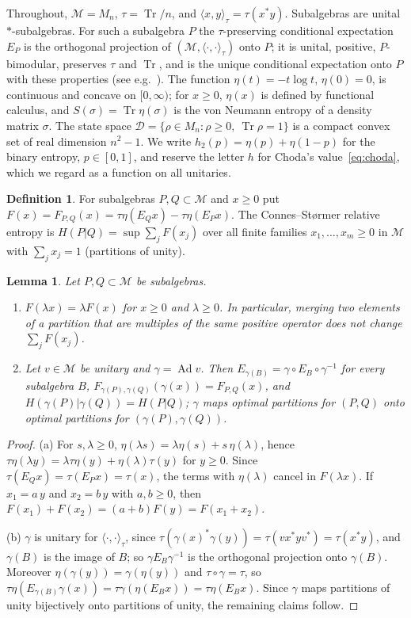 \documentclass[11pt]{article}
\DeclareMathOperator{\Tr}{Tr}
\DeclareMathOperator{\Ad}{Ad}
\newcommand{\M}{\mathcal{M}}
\newcommand{\D}{\mathcal{D}}
\theoremstyle{plain}
\newtheorem{lemma}[theorem]{Lemma}
\theoremstyle{definition}
\newtheorem{definition}[theorem]{Definition}
\theoremstyle{remark}
\begin{document}
Throughout, $\M=M_n$, $\tau=\Tr/n$, and $\langle x,y\rangle_\tau=\tau(x^*y)$. Subalgebras are unital $*$-subalgebras. For such
a subalgebra $P$ the $\tau$-preserving conditional expectation $E_P$ is the orthogonal projection of $(\M,\langle\cdot,\cdot
\rangle_\tau)$ onto $P$; it is unital, positive, $P$-bimodular, preserves $\tau$ and $\Tr$, and is the unique conditional
expectation onto $P$ with these properties (see e.g.~\cite{takesaki2002}). The function $\eta(t)=-t\log t$, $\eta(0)=0$, is
continuous and concave on $[0,\infty)$; for $x\ge0$, $\eta(x)$ is defined by functional calculus, and
$S(\sigma)=\Tr\eta(\sigma)$ is the von Neumann entropy of a density matrix $\sigma$. The state space
$\D=\{\rho\in M_n:\rho\ge0,\ \Tr\rho=1\}$ is a compact convex set of real dimension $n^2-1$. We write
$h_2(p)=\eta(p)+\eta(1-p)$ for the binary entropy, $p\in[0,1]$, and reserve the letter $h$ for Choda's
value~\eqref{eq:choda}, which we regard as a function on all unitaries.

\begin{definition}\label{def:cs}
For subalgebras $P,Q\subset\M$ and $x\ge0$ put $F(x)=F_{P,Q}(x)=\tau\eta(E_Qx)-\tau\eta(E_Px)$. The Connes--St{\o}rmer relative
entropy is $H(P|Q)=\sup\sum_jF(x_j)$ over all finite families $x_1,\dots,x_m\ge0$ in $\M$ with $\sum_jx_j=1$ (partitions
of unity).
\end{definition}

\begin{lemma}\label{lem:F}
Let $P,Q\subset\M$ be subalgebras.
\begin{enumerate}
\item[(a)] $F(\lambda x)=\lambda F(x)$ for $x\ge0$ and $\lambda\ge0$. In particular, merging two elements of a partition
that are multiples of the same positive operator does not change $\sum_jF(x_j)$.
\item[(b)] Let $v\in\M$ be unitary and $\gamma=\Ad v$. Then $E_{\gamma(B)}=\gamma\circ E_B\circ\gamma^{-1}$ for every subalgebra
$B$, $F_{\gamma(P),\gamma(Q)}(\gamma(x))=F_{P,Q}(x)$, and $H(\gamma(P)|\gamma(Q))=H(P|Q)$; $\gamma$ maps optimal partitions for
$(P,Q)$ onto optimal partitions for $(\gamma(P),\gamma(Q))$.
\end{enumerate}
\end{lemma}
\begin{proof}
(a) For $s,\lambda\ge0$, $\eta(\lambda s)=\lambda\eta(s)+s\,\eta(\lambda)$, hence $\tau\eta(\lambda y)=\lambda\tau\eta(y)+\eta(\lambda)\tau(y)$
for $y\ge0$. Since $\tau(E_Qx)=\tau(E_Px)=\tau(x)$, the terms with $\eta(\lambda)$ cancel in $F(\lambda x)$. If
$x_1=a\,y$ and $x_2=b\,y$ with $a,b\ge0$, then $F(x_1)+F(x_2)=(a+b)F(y)=F(x_1+x_2)$.

(b) $\gamma$ is unitary for $\langle\cdot,\cdot\rangle_\tau$, since $\tau(\gamma(x)^*\gamma(y))=\tau(vx^*yv^*)=\tau(x^*y)$, and
$\gamma(B)$ is the image of $B$; so $\gamma E_B\gamma^{-1}$ is the orthogonal projection onto $\gamma(B)$. Moreover
$\eta(\gamma(y))=\gamma(\eta(y))$ and $\tau\circ\gamma=\tau$, so $\tau\eta(E_{\gamma(B)}\gamma(x))=\tau\gamma(\eta(E_Bx))=\tau\eta(E_Bx)$.
Since $\gamma$ maps partitions of unity bijectively onto partitions of unity, the remaining claims follow.
\end{proof}
\end{document}
